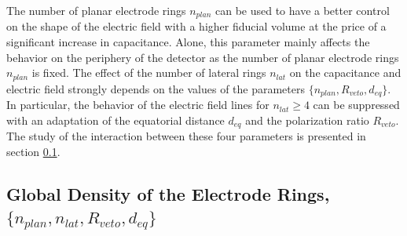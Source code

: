 The number of planar electrode rings $n_{plan}$ can be used to have a better control on the shape of the electric field with a higher fiducial volume at the price of a significant increase in capacitance. Alone, this parameter mainly affects the behavior on the periphery of the detector as the number of planar electrode rings $n_{plan}$ is fixed. The effect of the number of lateral rings $n_{lat}$ on the capacitance and electric field strongly depends on the values of the parameters $\{n_{plan}, R_{veto}, d_{eq}\}$. In particular, the behavior of the electric field lines for $n_{lat} \geq 4$ can be suppressed with an adaptation of the equatorial distance $d_{eq}$ and the polarization ratio $R_{veto}$. The study of the interaction between these four parameters is presented in section \ref{par:global-density}.

\subsection{Global Density of the Electrode Rings, $\{n_{plan}, n_{lat}, R_{veto}, d_{eq}\}$}
\label{par:global-density}

